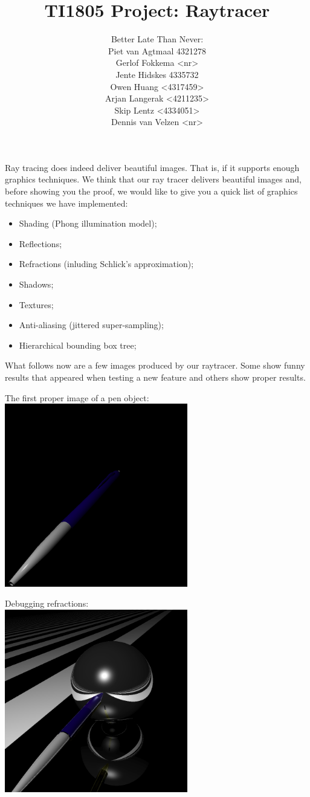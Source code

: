 \documentclass[a4paper,11pt]{article}
\title{TI1805 Project: Raytracer}
\author{Better Late Than Never:\\
		Piet van Agtmaal 4321278\\
		Gerlof Fokkema <nr>\\
		Jente Hidskes 4335732\\
		Owen Huang <4317459>\\
		Arjan Langerak <4211235>\\
		Skip Lentz <4334051>\\
		Dennis van Velzen <nr>\\
	   }
\begin{document}
\maketitle
Ray tracing does indeed deliver beautiful images. That is, if it supports enough graphics techniques. We think that our ray tracer delivers beautiful images and, before showing you the proof, we would like to give you a quick list of graphics techniques we have implemented:
\begin{itemize}
	\item Shading (Phong illumination model);
	\item Reflections;
	\item Refractions (inluding Schlick's approximation);
	\item Shadows;
	\item Textures;
	\item Anti-aliasing (jittered super-sampling);
	\item Hierarchical bounding box tree;
\end{itemize}
What follows now are a few images produced by our raytracer. Some show funny results that appeared when testing a new feature and others show proper results.

\newpage The first proper image of a pen object:\\
\includegraphics[keepaspectratio,width=8.0cm]{images/interpolate_pen}

Debugging refractions:\\
\includegraphics[keepaspectratio,width=8.0cm]{images/master-plane-sphere-pen}\\
\end{document}
